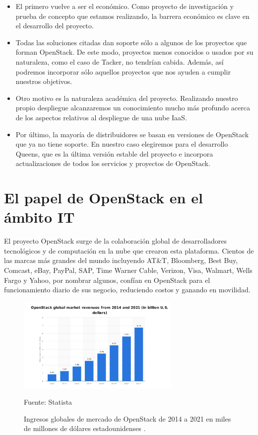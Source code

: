 \begin{itemize}
\item El primero vuelve a ser el económico. Como proyecto de investigación y prueba de concepto que estamos realizando, la barrera económico es clave en el desarrollo del proyecto.
\item Todas las soluciones citadas dan soporte sólo a algunos de los proyectos que forman OpenStack. De este modo, proyectos menos conocidos o usados por su naturaleza, como el caso de Tacker, no tendrían cabida. Además, así podremos incorporar sólo aquellos proyectos que nos ayuden a cumplir nuestros objetivos.
\item Otro motivo es la naturaleza académica del proyecto. Realizando nuestro propio despliegue alcanzaremos un conocimiento mucho más profundo acerca de los aspectos relativos al despliegue de una nube IaaS.
\item Por último, la mayoría de distribuidores se basan en versiones de OpenStack que ya no tiene soporte. En nuestro caso elegiremos para el desarrollo Queens, que es la última versión estable \cite{noauthor_releases:_nodate} del proyecto e incorpora actualizaciones de todos los servicios y proyectos de OpenStack. 
\end{itemize}



\section{El papel de OpenStack en el ámbito IT}

El proyecto OpenStack surge de la colaboración global de desarrolladores tecnológicos y de computación en la nube que crearon esta plataforma. Cientos de las marcas más grandes del mundo incluyendo AT\&T, Bloomberg, Best Buy, Comcast, eBay, PayPal, SAP, Time Warner Cable, Verizon, Visa, Walmart, Wells Fargo y Yahoo, por nombrar algunos, confían en OpenStack para el funcionamiento diario de sus negocio, reduciendo costos y ganando en movilidad. 

\begin{figure}
    \centering
    \includegraphics[width=0.7\textwidth]{imagenes/capitulo2/ganancias_OpenStack.png}
    \caption{Ingresos globales de mercado de OpenStack de 2014 a 2021 en miles de millones de dólares estadounidenses
.}
	\vspace{0.3cm}
    \footnotesize{Fuente: Statista}
    \label{ganancias_OpenStack}
\end{figure}

